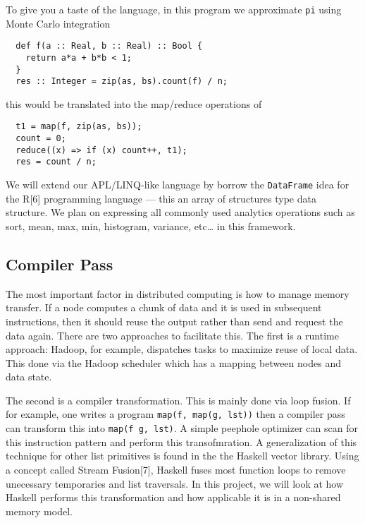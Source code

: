 To give you a taste of the language, in this program we approximate
\texttt{pi} using Monte Carlo integration

\begin{verbatim}
  def f(a :: Real, b :: Real) :: Bool {
    return a*a + b*b < 1;
  }
  res :: Integer = zip(as, bs).count(f) / n;
\end{verbatim}

this would be translated into the map/reduce operations of

\begin{verbatim}
  t1 = map(f, zip(as, bs));
  count = 0;
  reduce((x) => if (x) count++, t1);
  res = count / n;
\end{verbatim}

We will extend our APL/LINQ-like language by borrow the
\texttt{DataFrame} idea for the R{[}6{]} programming language --- this
an array of structures type data structure. We plan on expressing all
commonly used analytics operations such as sort, mean, max, min,
histogram, variance, etc\ldots{} in this framework.

\subsection{Compiler Pass}\label{compiler-pass}

The most important factor in distributed computing is how to manage
memory transfer. If a node computes a chunk of data and it is used in
subsequent instructions, then it should reuse the output rather than
send and request the data again. There are two approaches to facilitate
this. The first is a runtime approach: Hadoop, for example, dispatches
tasks to maximize reuse of local data. This done via the Hadoop
scheduler which has a mapping between nodes and data state.

The second is a compiler transformation. This is mainly done via loop
fusion. If for example, one writes a program
\texttt{map(f, map(g, lst))} then a compiler pass can transform this
into \texttt{map(f g, lst)}. A simple peephole optimizer can scan for
this instruction pattern and perform this transofmration. A
generalization of this technique for other list primitives is found in
the the Haskell vector library. Using a concept called Stream
Fusion{[}7{]}, Haskell fuses most function loops to remove unecessary
temporaries and list traversals. In this project, we will look at how
Haskell performs this transformation and how applicable it is in a
non-shared memory model.

